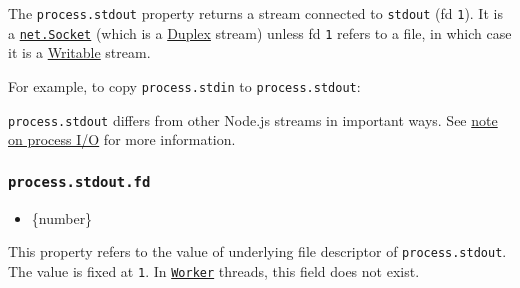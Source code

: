 The \texttt{process.stdout} property returns a stream connected to
\texttt{stdout} (fd \texttt{1}). It is a
\href{net.md\#class-netsocket}{\texttt{net.Socket}} (which is a
\href{stream.md\#duplex-and-transform-streams}{Duplex} stream) unless fd
\texttt{1} refers to a file, in which case it is a
\href{stream.md\#writable-streams}{Writable} stream.

For example, to copy \texttt{process.stdin} to \texttt{process.stdout}:

\begin{Shaded}
\begin{Highlighting}[]
\OperatorTok{,} \OperatorTok{;}

\OperatorTok{;}
\end{Highlighting}
\end{Shaded}

\begin{Shaded}
\begin{Highlighting}[]
\OperatorTok{,}\OperatorTok{=} \NormalTok{(}\NormalTok{)}\OperatorTok{;}

\OperatorTok{;}
\end{Highlighting}
\end{Shaded}

\texttt{process.stdout} differs from other Node.js streams in important
ways. See \hyperref[a-note-on-process-io]{note on process I/O} for more
information.

\subsubsection{\texorpdfstring{\texttt{process.stdout.fd}}{process.stdout.fd}}\label{process.stdout.fd}

\begin{itemize}
\tightlist
\item
  \{number\}
\end{itemize}

This property refers to the value of underlying file descriptor of
\texttt{process.stdout}. The value is fixed at \texttt{1}. In
\href{worker_threads.md\#class-worker}{\texttt{Worker}} threads, this
field does not exist.

